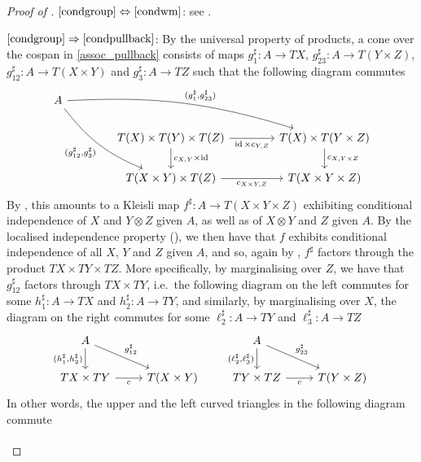 \documentclass[a4paper,UKenglish,numberwithinsect,cleveref, autoref, thm-restate]{lipics-v2021}
\theoremstyle{plain} %
\theoremstyle{definition} %
\begin{document}
\begin{proof}[Proof of ]
 $\ref{condgroup}\Leftrightarrow\ref{condwm}$: 
 see .
 
 $\ref{condgroup}\Rightarrow\ref{condpullback}$: 
 By the universal property of products, a cone over the cospan in \eqref{assoc_pullback} consists of maps $g_1^\sharp:A\to TX$, $g_{23}^\sharp:A\to T(Y\times Z)$, $g_{12}^\sharp:A\to T(X\times Y)$ and $g_3^\sharp:A\to TZ$ such that the following diagram commutes
 \[
  \begin{tikzcd}[column sep=3.3pc]
   A \ar[bend left=10]{drr}{(g_1^\sharp,g_{23}^\sharp)} \ar[bend right=15]{ddr}[swap]{(g_{12}^\sharp,g_3^\sharp)} \\
   & T(X) \times T(Y) \times T(Z) \ar{r}[swap]{\id \times c_{Y,Z}} \ar{d}{c_{X,Y} \times \id}	& T(X) \times T(Y \times Z) \ar{d}{c_{X,Y \times Z}}	\\
   & T(X \times Y) \times T(Z) \ar{r}[swap]{c_{X\times Y,Z}}						& T(X \times Y \times Z)
  \end{tikzcd}
 \]
 By , this amounts to a Kleisli map $f^\sharp:A\to T(X\times Y\times Z)$ exhibiting conditional independence of $X$ and $Y\otimes Z$ given $A$, as well as of $X\otimes Y$ and $Z$ given $A$. By the localised independence property (), we then have that $f$ exhibits conditional independence of all $X$, $Y$ and $Z$ given $A$, and so, again by , $f^\sharp$ factors through the product $TX\times TY\times TZ$. 
 More specifically, by marginalising over $Z$, we have that $g_{12}^\sharp$ factors through $TX\times TY$, i.e.~the following diagram on the left commutes for some $h_1^\sharp:A\to TX$ and $h_2^\sharp:A\to TY$, and similarly, by marginalising over $X$, the diagram on the right commutes for some $\ell_2^\sharp:A\to TY$ and $\ell_3^\sharp:A\to TZ$
 \[
  \begin{tikzcd}
   A \ar{d}[swap]{(h_1^\sharp,h_2^\sharp)} \ar{dr}{g_{12}^\sharp} \\
   TX\times TY \ar{r}[swap]{c} & T(X\times Y) 
  \end{tikzcd}
  \qquad
  \begin{tikzcd}
   A \ar{d}[swap]{(\ell_2^\sharp,\ell_3^\sharp)} \ar{dr}{g_{23}^\sharp} \\
   TY\times TZ \ar{r}[swap]{c} & T(Y\times Z) 
  \end{tikzcd}
 \]
 In other words, the upper and the left curved triangles in the following diagram commute
\[
  \begin{tikzcd}[column sep=3.3pc]

\end{tikzcd}\]
\end{proof}
\end{document}
